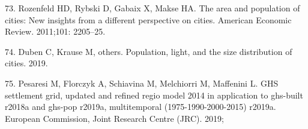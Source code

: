 \documentclass[10pt,letterpaper]{article}
\begin{document}
\leavevmode\hypertarget{ref-rozenfeld2011area}{}%
73. Rozenfeld HD, Rybski D, Gabaix X, Makse HA. The area and population
of cities: New insights from a different perspective on cities. American
Economic Review. 2011;101: 2205--25.

\leavevmode\hypertarget{ref-duben2019population}{}%
74. Duben C, Krause M, others. Population, light, and the size
distribution of cities. 2019.

\leavevmode\hypertarget{ref-pesaresi2019ghs}{}%
75. Pesaresi M, Florczyk A, Schiavina M, Melchiorri M, Maffenini L. GHS
settlement grid, updated and refined regio model 2014 in application to
ghs-built r2018a and ghs-pop r2019a, multitemporal (1975-1990-2000-2015)
r2019a. European Commission, Joint Research Centre (JRC). 2019;

\nolinenumbers
\end{document}
